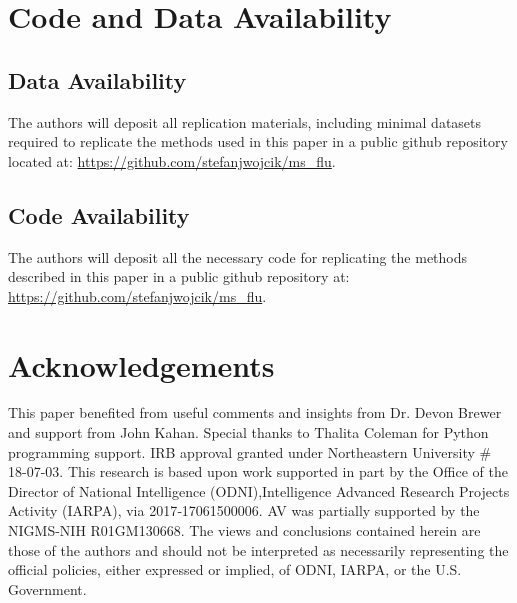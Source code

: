 \documentclass[fleqn,10pt]{wlscirep}
\begin{document}


\section*{Code and Data Availability}

\subsection*{Data Availability}

The authors will deposit all replication materials, including minimal datasets required to replicate the methods used in this paper in a public github repository located at: \url{https://github.com/stefanjwojcik/ms_flu}.

\subsection*{Code Availability}

The authors will deposit all the necessary code for replicating the methods described in this paper in a public github repository at: \url{https://github.com/stefanjwojcik/ms_flu}.






\section*{Acknowledgements}

This paper benefited from useful comments and insights from Dr. Devon Brewer and support from John Kahan. Special thanks to Thalita Coleman for Python programming support. IRB approval granted under Northeastern University \# 18-07-03. This research is based upon work supported in part by the Office of the Director of National Intelligence (ODNI),Intelligence Advanced Research Projects Activity (IARPA), via 2017‐17061500006. AV was partially supported by the NIGMS-NIH R01GM130668. The views and conclusions contained herein are those of the authors and should not be interpreted as necessarily representing the official policies, either expressed or implied, of ODNI, IARPA, or the U.S. Government.
\end{document}
